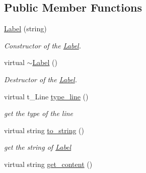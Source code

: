 \subsection*{\-Public \-Member \-Functions}
\begin{DoxyCompactItemize}
\item 
\hypertarget{classLabel_a48e774efc0e6e5cd0bf63a94527add17}{\hyperlink{classLabel_a48e774efc0e6e5cd0bf63a94527add17}{\-Label} (string)}\label{classLabel_a48e774efc0e6e5cd0bf63a94527add17}

\begin{DoxyCompactList}\small\item\em \-Constructor of the \hyperlink{classLabel}{\-Label}. \end{DoxyCompactList}\item 
\hypertarget{classLabel_ae0405d591a2ff63c03b104435e2a3066}{virtual \hyperlink{classLabel_ae0405d591a2ff63c03b104435e2a3066}{$\sim$\-Label} ()}\label{classLabel_ae0405d591a2ff63c03b104435e2a3066}

\begin{DoxyCompactList}\small\item\em \-Destructor of the \hyperlink{classLabel}{\-Label}. \end{DoxyCompactList}\item 
\hypertarget{classLabel_afc727d8ae97b32660faf703b30edc77e}{virtual t\-\_\-\-Line \hyperlink{classLabel_afc727d8ae97b32660faf703b30edc77e}{type\-\_\-line} ()}\label{classLabel_afc727d8ae97b32660faf703b30edc77e}

\begin{DoxyCompactList}\small\item\em get the type of the line \end{DoxyCompactList}\item 
\hypertarget{classLabel_a6df2e96366cc459a6a8fa9642a6e69b6}{virtual string \hyperlink{classLabel_a6df2e96366cc459a6a8fa9642a6e69b6}{to\-\_\-string} ()}\label{classLabel_a6df2e96366cc459a6a8fa9642a6e69b6}

\begin{DoxyCompactList}\small\item\em get the string of \hyperlink{classLabel}{\-Label} \end{DoxyCompactList}\item 
\hypertarget{classLabel_a8d48d53b6eb2c6024b7da507bfa5d00b}{virtual string \hyperlink{classLabel_a8d48d53b6eb2c6024b7da507bfa5d00b}{get\-\_\-content} ()}\label{classLabel_a8d48d53b6eb2c6024b7da507bfa5d00b}


\end{DoxyCompactItemize}
